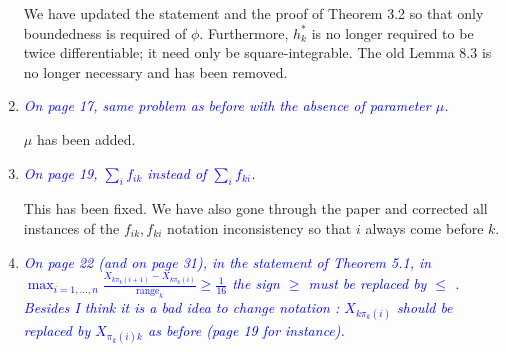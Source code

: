 \documentclass[pdftex,12pt]{article}
\let\hat\widehat
\def\rc#1{{\it\textcolor{blue}{#1}}\smallskip}
\begin{document}
\begin{enumerate}
We have updated the statement and the proof of Theorem 3.2 so that only boundedness is required of $\phi$. Furthermore, $h^*_k$ is no longer required to be twice differentiable; it need only be square-integrable. The old Lemma 8.3 is no longer necessary and has been removed. 

\item \rc{On page 17, same problem as before with the absence of parameter $\mu$.}

$\mu$ has been added.



\item \rc{On page 19, $\sum_{i} f_{ik}$ instead of $\sum_i
  f_{ki}$.}

This has been fixed. We have also gone through the paper and corrected all instances of the $f_{ik}, f_{ki}$ notation inconsistency so that $i$ always come before $k$.





\item \rc{On page 22 (and on page 31), in the statement of Theorem
  5.1, in\\ $\max_{i=1,\ldots, n} \frac{X_{k\pi_k(i+1)}-
    X_{k\pi_k(i)}}{\text{range}_k} \geq \frac{1}{16}$ the
sign $\geq$ must be replaced by $\leq$ . Besides I think it
is a bad idea to change notation : $X_{k\pi_k(i)}$ should
be replaced by $X_{\pi_k(i)k}$ as before (page 19 for instance).}


\end{enumerate}
\end{document}
